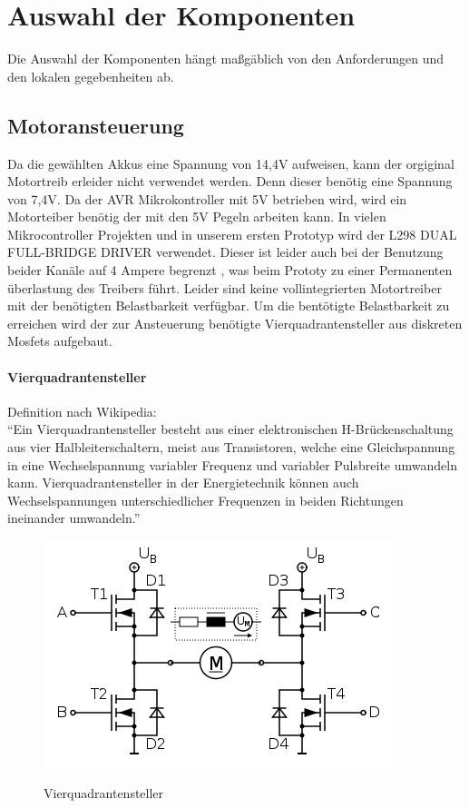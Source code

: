 \chapter{Auswahl der Komponenten}
Die Auswahl der Komponenten hängt maßgäblich von den Anforderungen und den lokalen gegebenheiten ab.


\section{Motoransteuerung}

Da die gewählten Akkus eine Spannung von 14,4V aufweisen, kann der orgiginal Motortreib erleider nicht verwendet werden.
Denn dieser benötig eine Spannung von 7,4V. Da der AVR Mikrokontroller mit 5V betrieben wird, wird ein Motorteiber benötig der
mit den 5V Pegeln arbeiten kann. In vielen Mikrocontroller Projekten und in unserem ersten Prototyp wird der L298 DUAL FULL-BRIDGE DRIVER
verwendet. Dieser ist leider auch bei der Benutzung beider Kanäle auf 4 Ampere begrenzt \cite{L298}, was beim Prototy zu einer Permanenten
überlastung des Treibers führt. Leider sind keine vollintegrierten Motortreiber mit der benötigten Belastbarkeit verfügbar.
Um die bentötigte Belastbarkeit zu erreichen wird der zur Ansteuerung benötigte Vierquadrantensteller aus diskreten Mosfets aufgebaut.

\subsubsection{Vierquadrantensteller}
Definition nach Wikipedia:\\
``Ein Vierquadrantensteller besteht aus einer elektronischen H-Brückenschaltung aus vier Halbleiterschaltern, meist aus Transistoren, 
welche eine Gleichspannung in eine Wechselspannung variabler Frequenz und variabler Pulsbreite umwandeln kann. Vierquadrantensteller 
in der Energietechnik können auch Wechselspannungen unterschiedlicher Frequenzen in beiden Richtungen ineinander umwandeln.''


\begin{figure}[H]
\centering
\includegraphics[width=.8\textwidth]{Vierquadrantensteller.png}\\
\caption{Vierquadrantensteller}%
\label{fig:Vierquadrantensteller}
\end{figure}


